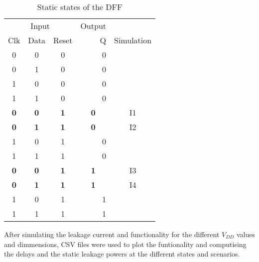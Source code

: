\begin{table}[H]
    \centering
    \caption{Static states of the DFF}
    \label{tab:static_states}
    \begin{tabular}{cccrl}
        \hline
        \multicolumn{3}{c}{Input}                                 & Output                         &                                \\ \cline{1-4}
        Clk                             & Data       & Reset      & Q                              & Simulation                     \\ \cline{1-4}
        0                               & 0          & 0          & 0                              &                                \\            
        0                               & 1          & 0          & 0                              &                                \\            
        1                               & 0          & 0          & 0                              &                                \\            
        1                               & 1          & 0          & 0                              &                                \\ \cline{1-4}
        \multicolumn{1}{|c}{\textbf{0}} & \textbf{0} & \textbf{1} & \multicolumn{1}{c|}{\textbf{0}}& \multicolumn{1}{c}{I1}         \\ \cline{1-4}
        \multicolumn{1}{|c}{\textbf{0}} & \textbf{1} & \textbf{1} & \multicolumn{1}{c|}{\textbf{0}}& \multicolumn{1}{c}{I2}         \\ \cline{1-4}
        1                               & 0          & 1          & 0                              &                                \\            
        1                               & 1          & 1          & 0                              &                                \\ \cline{1-4}
        \multicolumn{1}{|c}{\textbf{0}} & \textbf{0} & \textbf{1} & \multicolumn{1}{c|}{\textbf{1}}& \multicolumn{1}{c}{I3}         \\ \cline{1-4}
        \multicolumn{1}{|c}{\textbf{0}} & \textbf{1} & \textbf{1} & \multicolumn{1}{c|}{\textbf{1}}& \multicolumn{1}{c}{I4}         \\ \cline{1-4}
        1                               & 0          & 1          & 1                              &                                \\            
        1                               & 1          & 1          & 1                              &                          
    \end{tabular}
\end{table}


After simulating the leakage current and functionality for the different $V_{DD}$ values and dimmensions, CSV files were used to plot the funtionality and computising the delays and the static leakage powers at the different states and scenarios.
